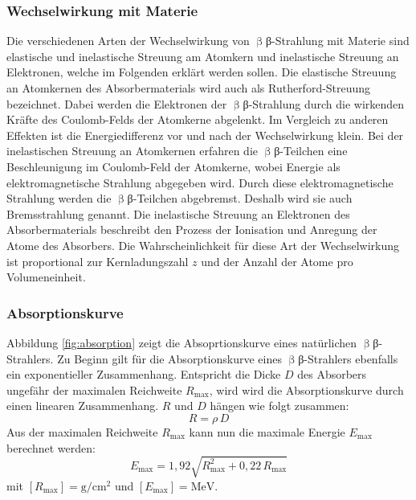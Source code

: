 \subsubsection{Wechselwirkung mit Materie}
Die verschiedenen Arten der Wechselwirkung von $\upbeta${β}-Strahlung mit Materie sind elastische und inelastische Streuung am Atomkern und inelastische Streuung an Elektronen, welche im Folgenden erklärt werden sollen.
Die elastische Streuung an Atomkernen des Absorbermaterials wird auch als Rutherford-Streuung bezeichnet. Dabei werden die Elektronen der $\upbeta${β}-Strahlung durch die wirkenden Kräfte des Coulomb-Felds der Atomkerne abgelenkt. Im Vergleich zu anderen Effekten ist die Energiedifferenz vor und nach der Wechselwirkung klein.
Bei der inelastischen Streuung an Atomkernen erfahren die $\upbeta${β}-Teilchen eine Beschleunigung im Coulomb-Feld der Atomkerne, wobei Energie als elektromagnetische Strahlung abgegeben wird. Durch diese elektromagnetische Strahlung werden die $\upbeta${β}-Teilchen abgebremst. Deshalb wird sie auch Bremsstrahlung genannt.
Die inelastische Streuung an Elektronen des Absorbermaterials beschreibt den Prozess der Ionisation und Anregung der Atome des Absorbers. Die Wahrscheinlichkeit für diese Art der Wechselwirkung ist proportional zur Kernladungszahl $z$ und der Anzahl der Atome pro Volumeneinheit.

\subsubsection{Absorptionskurve}
Abbildung \ref{fig:absorption} zeigt die Absoprtionskurve eines natürlichen $\upbeta${β}-Strahlers. Zu Beginn gilt für die Absorptionskurve eines $\upbeta${β}-Strahlers ebenfalls ein exponentieller Zusammenhang. Entspricht die Dicke $D$ des Absorbers ungefähr der maximalen Reichweite $R_\mathrm{max}$, wird wird die Absorptionskurve durch einen linearen Zusammenhang. $R$ und $D$ hängen wie folgt zusammen:
\begin{equation}
  R=\rho\,D
\end{equation}
Aus der maximalen Reichweite $R_\mathrm{max}$ kann nun die maximale Energie $E_\mathrm{max}$ berechnet werden:
\begin{equation}
  \label{eqn:E_max}
  E_\mathrm{max} = 1,92 \sqrt{R_\mathrm{max}^2+0,22\,R_\mathrm{max}}
\end{equation}
mit $[R_\mathrm{max}]=\si{\gram\per\centi\meter\squared}$ und $[E_\mathrm{max}]= \si{\mega\electronvolt}$.
